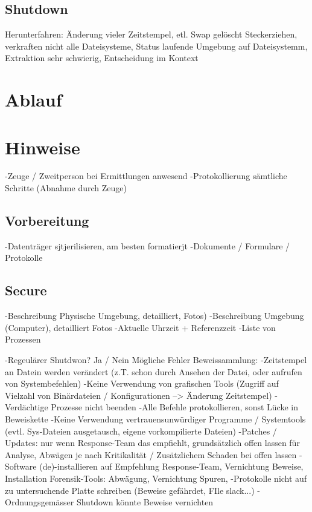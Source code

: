 \subsection{Shutdown}
Herunterfahren: Änderung vieler Zeitstempel, etl. Swap gelöscht
Steckerziehen, verkraften nicht alle Dateisysteme, Status laufende Umgebung auf Dateisystemm, Extraktion sehr schwierig, Entscheidung im Kontext
\section{Ablauf}


\section{Hinweise}
-Zeuge / Zweitperson bei Ermittlungen anwesend
-Protokollierung sämtliche Schritte (Abnahme durch Zeuge)

\subsection{Vorbereitung}
-Datenträger sjtjerilisieren, am besten formatierjt
-Dokumente / Formulare / Protokolle

\subsection{Secure}
-Beschreibung Physische Umgebung, detailliert, Fotos)
-Beschreibung Umgebung (Computer), detailliert Fotos
-Aktuelle Uhrzeit + Referenzzeit
-Liste von Prozessen

-Regeulärer Shutdwon? Ja / Nein
Mögliche Fehler Beweissammlung:
-Zeitstempel an Datein werden verändert (z.T. schon durch Ansehen der Datei, oder aufrufen von Systembefehlen)
-Keine Verwendung von grafischen Tools (Zugriff auf Vielzahl von Binärdateien / Konfigurationen --> Änderung Zeitstempel)
-Verdächtige Prozesse nicht beenden
-Alle Befehle protokollieren, sonst Lücke in Beweiskette
-Keine Verwendung vertrauensunwürdiger Programme / Systemtools (evtl. Sys-Dateien ausgetausch, eigene vorkompilierte Dateien)
-Patches / Updates: nur wenn Response-Team das empfiehlt, grundsätzlich offen lassen für Analyse, Abwägen je nach Kritikalität / Zusätzlichem Schaden bei offen lassen
-Software (de)-installieren auf Empfehlung Response-Team, Vernichtung Beweise, Installation Forensik-Tools: Abwägung, Vernichtung Spuren, 
-Protokolle nicht auf zu untersuchende Platte schreiben (Beweise gefährdet, FIle slack...)
-Ordnungsgemässer Shutdown könnte Beweise vernichten 

